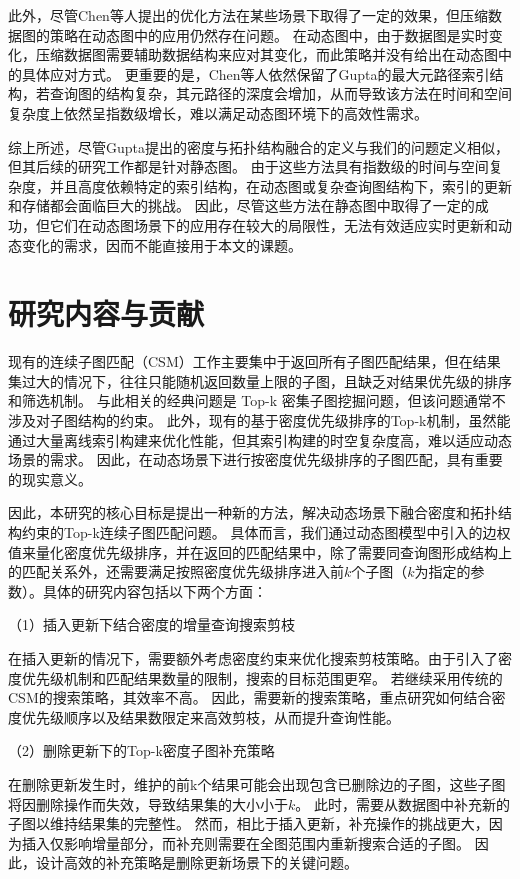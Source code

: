 此外，尽管Chen等人提出的优化方法在某些场景下取得了一定的效果，但压缩数据图的策略在动态图中的应用仍然存在问题。
在动态图中，由于数据图是实时变化，压缩数据图需要辅助数据结构来应对其变化，而此策略并没有给出在动态图中的具体应对方式。
更重要的是，Chen等人依然保留了Gupta的最大元路径索引结构，若查询图的结构复杂，其元路径的深度会增加，从而导致该方法在时间和空间复杂度上依然呈指数级增长，难以满足动态图环境下的高效性需求。


综上所述，尽管Gupta提出的密度与拓扑结构融合的定义与我们的问题定义相似，但其后续的研究工作都是针对静态图。
由于这些方法具有指数级的时间与空间复杂度，并且高度依赖特定的索引结构，在动态图或复杂查询图结构下，索引的更新和存储都会面临巨大的挑战。
因此，尽管这些方法在静态图中取得了一定的成功，但它们在动态图场景下的应用存在较大的局限性，无法有效适应实时更新和动态变化的需求，因而不能直接用于本文的课题。
\section{研究内容与贡献}
现有的连续子图匹配（CSM）工作主要集中于返回所有子图匹配结果，但在结果集过大的情况下，往往只能随机返回数量上限的子图，且缺乏对结果优先级的排序和筛选机制。
与此相关的经典问题是 Top-k 密集子图挖掘问题，但该问题通常不涉及对子图结构的约束。
此外，现有的基于密度优先级排序的Top-k机制，虽然能通过大量离线索引构建来优化性能，但其索引构建的时空复杂度高，难以适应动态场景的需求。
因此，在动态场景下进行按密度优先级排序的子图匹配，具有重要的现实意义。


因此，本研究的核心目标是提出一种新的方法，解决动态场景下融合密度和拓扑结构约束的Top-k连续子图匹配问题。
具体而言，我们通过动态图模型中引入的边权值来量化密度优先级排序，并在返回的匹配结果中，除了需要同查询图形成结构上的匹配关系外，还需要满足按照密度优先级排序进入前$k$个子图（$k$为指定的参数）。具体的研究内容包括以下两个方面：

（1）插入更新下结合密度的增量查询搜索剪枝

      在插入更新的情况下，需要额外考虑密度约束来优化搜索剪枝策略。由于引入了密度优先级机制和匹配结果数量的限制，搜索的目标范围更窄。
      若继续采用传统的CSM的搜索策略，其效率不高。
      因此，需要新的搜索策略，重点研究如何结合密度优先级顺序以及结果数限定来高效剪枝，从而提升查询性能。

（2）删除更新下的Top-k密度子图补充策略

   在删除更新发生时，维护的前k个结果可能会出现包含已删除边的子图，这些子图将因删除操作而失效，导致结果集的大小小于$k$。
   此时，需要从数据图中补充新的子图以维持结果集的完整性。
   然而，相比于插入更新，补充操作的挑战更大，因为插入仅影响增量部分，而补充则需要在全图范围内重新搜索合适的子图。
   因此，设计高效的补充策略是删除更新场景下的关键问题。

